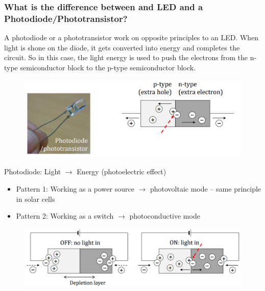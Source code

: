 \documentclass[class=report, crop=false, 12pt,a4paper]{standalone}
\begin{document}
\subsubsection{What is the difference between and LED and a Photodiode/Phototransistor?}
A photodiode or a phototransistor work on opposite principles to an LED. When light is shone on the diode, it gets converted into energy and completes the circuit. So in this case, the light energy is used to push the electrons from the n-type semiconductor block to the p-type semiconductor block.
\begin{figure}[H]
  \centering
  \includegraphics[width = 1 \textwidth]{../img/Mdiagram54.png}
\end{figure}
Photodiode: Light $\rightarrow$ Energy (photoelectric effect)
\begin{itemize}
  \item Pattern 1: Working as a power source $\longrightarrow$ photovoltaic mode – same principle in solar cells
  \item Pattern 2: Working as a switch $\longrightarrow$ photoconductive mode
\end{itemize}
\begin{figure}[H]
  \centering
  \includegraphics[width = 0.9 \textwidth]{../img/Mdiagram55.png}
\end{figure}
\end{document}
